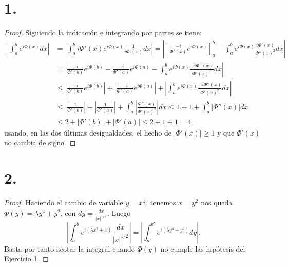 \documentclass[11pt,a4paper]{article}
\begin{document}
\section*{1.}
\begin{proof}
Siguiendo la indicación e integrando por partes se tiene:
\begin{align*}
    \left|\int_a^b e^{i\Phi(x)}dx\right| &= \left|\int_a^b i \Phi'(x) e^{i\Phi(x)} \frac 1{i \Phi'(x)}dx\right| = \left| \left[ \frac{-i}{\Phi'(x)} e^{i\Phi(x)}  \right]_a^b - \int_a^b e^{i\Phi(x)} \frac{i \Phi'(x)}{\Phi''(x)^2} dx\right| \\ 
    &= \left| \frac{-i}{\Phi'(b)} e^{i\Phi(b)} - \frac{-i}{\Phi'(a)} e^{i\Phi(a)} - \int_a^b e^{i\Phi(x)} \frac{-i\Phi''(x)} {\Phi'(x)^2} dx\right| \\
    &\le \left| \frac{-i}{\Phi'(b)} e^{i\Phi(b)} \right| + \left| \frac{-i}{\Phi'(a)} e^{i\Phi(a)} \right| + \left| \int_a^b e^{i\Phi(x)} \frac{-i\Phi''(x)} {\Phi'(x)^2} dx \right| \\
    &\le \left| \frac{1}{\Phi'(b)} \right| + \left| \frac{1}{\Phi'(a)} \right| + \int_a^b \left|\frac{\Phi''(x)} {\Phi'(x)^2} \right| dx \le 1 + 1 + \int_a^b|\Phi''(x)|dx \\
    &\le 2 + |\Phi'(b)| + |\Phi'(a)| \le 2 + 1 + 1 = 4,
\end{align*}
usando, en las dos últimas desigualdades, el hecho de $|\Phi'(x)|\ge 1$ y que $ \Phi'(x) $ no cambia de signo.
\end{proof}

\section*{2.}
\begin{proof}
Haciendo el cambio de variable $ y = x^{\frac{1}{2}} $, tenemos $ x = y^2 $ nos queda $\Phi(y) = \lambda y^4 + y^2 $, con $ dy = \frac{dx}{|x|^{1/2}} $. Luego
$$
\left|\int_a^b e^{i(\lambda x^2+x)}\frac{dx}{|x|^{1/2}}\right| = \left|\int_{a'}^{b'} e^{i(\lambda y^4 + y^2)}dy\right|.
$$
Basta por tanto acotar la integral cuando $ \Phi(y) $ no cumple las hipótesis del Ejercicio 1.
\end{proof}
\end{document}
